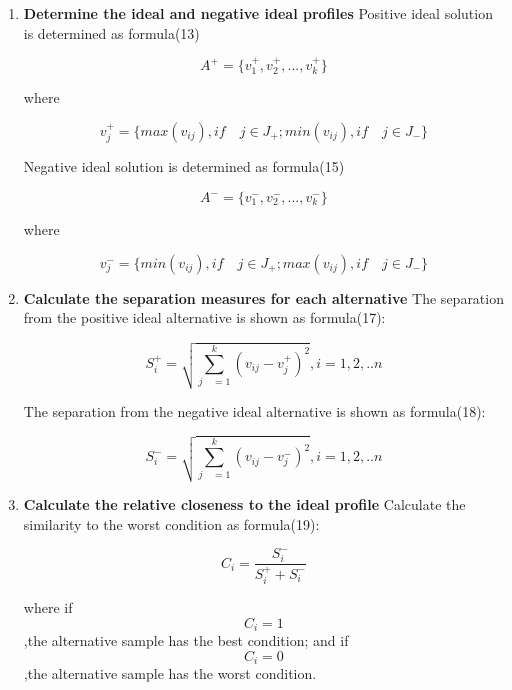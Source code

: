 \documentclass{mcmthesis}
\begin{document}
\begin{enumerate}
          \item \textbf{Determine the ideal and negative ideal profiles}
          Positive ideal solution is determined as formula(13)
            \begin{table}[!hbpt]
               \centering
               $$ { A }^{ + }=\{ { v }_{ 1 }^{ + },{ v }_{ 2 }^{ + },...,{ v }_{ k }^{ + }\}  $$
             \end{table}
        where
            \begin{table}[!hbpt]
               \centering
               $$ { v }_{ j }^{ + }=\{ max({ v }_{ ij }),if\quad j\in J_+;min({ v }_{ ij }),if\quad j\in J_-\}  $$
             \end{table}
        Negative ideal solution is determined as formula(15)
            \begin{table}[!hbpt]
               \centering
               $$ { A }^{ - }=\{ { v }_{ 1 }^{ - },{ v }_{ 2 }^{ - },...,{ v }_{ k }^{ - }\}  $$
             \end{table}
        where
            \begin{table}[!hbpt]
               \centering
               $$ { v }_{ j }^{ - }=\{ min({ v }_{ ij }),if\quad j\in J_+;max({ v }_{ ij }),if\quad j\in J_-\}   $$
             \end{table}

          \item \textbf{Calculate the separation measures for each alternative}
         The separation from the positive ideal alternative is shown as formula(17):
            \begin{table}[!hbpt]
               \centering
               $$ { S }_{ i }^{ + }=\sqrt { \sum _{ j\quad =1 }^{ k }{ { ({ v }_{ ij }-{ v }_{ j }^{ + }) }^{ 2 } }  } ,i = 1,2,..n $$
             \end{table}
          The separation from the negative ideal alternative is shown as formula(18):
            \begin{table}[!hbpt]
               \centering
               $$ { S }_{ i }^{ - }=\sqrt { \sum _{ j\quad =1 }^{ k }{ { ({ v }_{ ij }-{ v }_{ j }^{ - }) }^{ 2 } }  } ,i = 1,2,..n $$
             \end{table}

          \item \textbf{Calculate the relative closeness to the ideal profile}
         Calculate the similarity to the worst condition as formula(19):
            \begin{table}[!hbpt]
               \centering
               $$ C_{ { i } }=\frac { { S }_{ i }^{ - } }{ { S }_{ i }^{ + }+{ S }_{ i }^{ - } }  $$
             \end{table}
         where
         if $$ C_{i}=1 $$,the alternative sample has the best condition; and
         if $$ C_{i}=0 $$,the alternative sample has the worst condition.



\end{enumerate}
\end{document}
